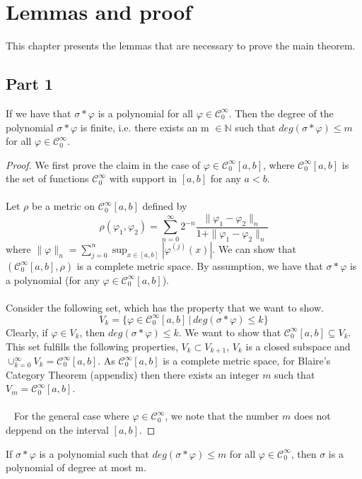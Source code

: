 \documentclass[../main.tex]{subfiles}
\begin{document}
	\chapter{Lemmas and proof} \label{ch:proof}
	This chapter presents the lemmas that are necessary to prove the main theorem.  
	\section{Part 1}
	\begin{lema}  %
		If we have that $\sigma \ast \varphi $ is a polynomial for all $\varphi \in \mathcal{C}^\infty_0 $.  Then the degree of the polynomial $\sigma \ast \varphi $ is finite, i.e. there exists an m $\in \mathbb{N}$ such that $ deg (\sigma \ast \varphi) \leq m$ for all $\varphi \in \mathcal{C}^\infty_0$. 
	\end{lema}
	
	\begin{proof}
		We first prove the claim in the case of $\varphi \in \mathcal{C}^\infty_0[a,b]$, where $\mathcal{C}^\infty_0[a,b]$ is the set of functions $\mathcal{C}^\infty_0$ with support in $[a,b]$ for any $a<b$. \\ \\ Let $\rho$ be a metric on $\mathcal{C}^\infty_0[a,b]$ defined by
		$$\rho(\varphi_1,\varphi_2) = \sum_{n=0}^\infty 2^{-n}  \frac{\|\varphi_1 -\varphi_2\|_n}{1+\|\varphi_1 -\varphi_2\|_n}$$ where $\|\varphi\|_n= \sum_{j=0}^n \sup_{x\in [a,b]} | \varphi^{(j)}(x)| $. We can show that $(\mathcal{C}^\infty_0[a,b],\rho)$  is a complete metric space. By assumption, we have that $\sigma \ast \varphi$ is a polynomial (for any $\varphi \in \mathcal{C}^\infty_0[a,b]$). \\ \\  Consider the following set, which has the property that we want to show.  \\ $$V_k= \{\varphi \in \mathcal{C}_0^\infty[a,b] \, | \,  deg(\sigma \ast \varphi ) \leq k\}$$ Clearly, if $\varphi \in V_k$, then $deg(\sigma \ast \varphi) \leq k.$ We want to show that $\mathcal{C}_0^\infty[a,b] \subseteq V_k.$ This set fulfills the following properties, $V_k \subset V_{k+1}$, $V_k $ is a closed subspace and $\cup_{k=0}^\infty V_k = \mathcal{C}_0^\infty[a,b]$. As $\mathcal{C}_0^\infty[a,b]$ is a complete metric space, for Blaire's Category Theorem (appendix) then there exists an integer $m$ such that $V_m=\mathcal{C}_0^\infty[a,b]$. \\ \\ 
		For the general case where $\varphi \in \mathcal{C}_0^\infty$, we note that the number $m$ does not deppend on the interval $[a,b]$.  

	\end{proof}
	\begin{lema} %
		If $\sigma \ast \varphi$ is a polynomial such that $ deg (\sigma \ast \varphi) \leq m$ for all $\varphi \in \mathcal{C}^\infty_0$, then $\sigma$ is a polynomial of degree at most m.
	\end{lema}
	
\end{document}
